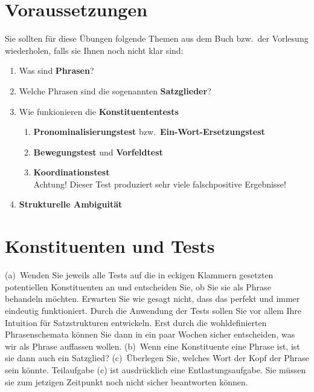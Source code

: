 \section*{Voraussetzungen}

Sie sollten für diese Übungen folgende Themen aus dem Buch bzw.\ der Vorlesung wiederholen, falls sie Ihnen noch nicht klar sind:

\begin{enumerate}\Lf
  \item Was sind \textbf{Phrasen}?
  \item Welche Phrasen sind die sogenannten \textbf{Satzglieder}?
  \item Wie funkionieren die \textbf{Konstituententests}
    \begin{enumerate}\Lf
      \item \textbf{Pronominalisierungstest} bzw.\ \textbf{Ein-Wort-Ersetzungstest}
      \item \textbf{Bewegungstest} und \textbf{Vorfeldtest}
      \item \textbf{Koordinationstest}\\
        Achtung! Dieser Test produziert sehr viele falschpositive Ergebnisse!
    \end{enumerate}
  \item \textbf{Strukturelle Ambiguität}
\end{enumerate}

\section{Konstituenten und Tests}

(a)~Wenden Sie jeweils alle Tests auf die in eckigen Klammern gesetzten potentiellen Konstituenten an und entscheiden Sie, ob Sie sie als Phrase behandeln möchten.
Erwarten Sie wie gesagt nicht, dass das perfekt und immer eindeutig funktioniert.
Durch die Anwendung der Tests sollen Sie vor allem Ihre Intuition für Satzstrukturen entwickeln.
Erst durch die wohldefinierten Phrasenschemata können Sie dann in ein paar Wochen sicher entscheiden, was wir als Phrase auffassen wollen.
(b)~Wenn eine Konstituente eine Phrase ist, ist sie dann auch ein Satzglied?
(c)~Überlegen Sie, welches Wort der Kopf der Phrase sein könnte.
Teilaufgabe (c) ist ausdrücklich eine Entlastungsaufgabe.
Sie müssen sie zum jetzigen Zeitpunkt noch nicht sicher beantworten können.

\Halbzeile


